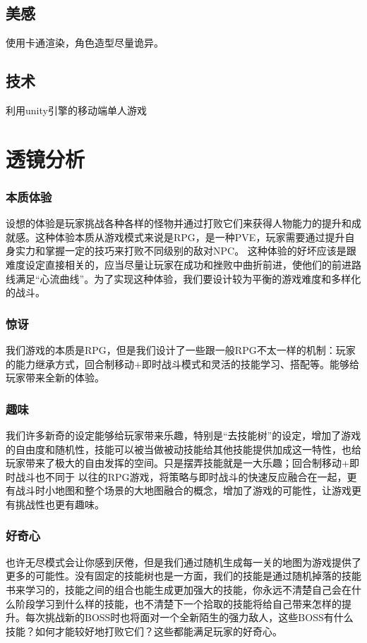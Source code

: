 \documentclass{article}
\begin{document}
\subsection{美感}
使用卡通渲染，角色造型尽量诡异。
\subsection{技术}
利用unity引擎的移动端单人游戏
\section{透镜分析}
\subsubsection{本质体验}
设想的体验是玩家挑战各种各样的怪物并通过打败它们来获得人物能力的提升和成就感。这种体验本质从游戏模式来说是RPG，是一种PVE，玩家需要通过提升自身实力和掌握一定的技巧来打败不同级别的敌对NPC。
这种体验的好坏应该是跟难度设定直接相关的，应当尽量让玩家在成功和挫败中曲折前进，使他们的前进路线满足“心流曲线”。为了实现这种体验，我们要设计较为平衡的游戏难度和多样化的战斗。
\subsubsection{惊讶}
我们游戏的本质是RPG，但是我们设计了一些跟一般RPG不太一样的机制：玩家的能力继承方式，回合制移动+即时战斗模式和灵活的技能学习、搭配等。能够给玩家带来全新的体验。
\subsubsection{趣味}
我们许多新奇的设定能够给玩家带来乐趣，特别是“去技能树”的设定，增加了游戏的自由度和随机性，技能可以被当做被动技能给其他技能提供加成这一特性，也给玩家带来了极大的自由发挥的空间。只是摆弄技能就是一大乐趣；回合制移动+即时战斗也不同于
以往的RPG游戏，将策略与即时战斗的快速反应融合在一起，更有战斗时小地图和整个场景的大地图融合的概念，增加了游戏的可能性，让游戏更有挑战性也更有趣味。
\subsubsection{好奇心}
也许无尽模式会让你感到厌倦，但是我们通过随机生成每一关的地图为游戏提供了更多的可能性。没有固定的技能树也是一方面，我们的技能是通过随机掉落的技能书来学习的，技能之间的组合也能生成更加强大的技能，你永远不清楚自己会在什么阶段学习到什么样的技能，也不清楚下一个拾取的技能将给自己带来怎样的提升。每次挑战新的BOSS时也将面对一个全新陌生的强力敌人，这些BOSS有什么技能？如何才能较好地打败它们？这些都能满足玩家的好奇心。
\end{document}
